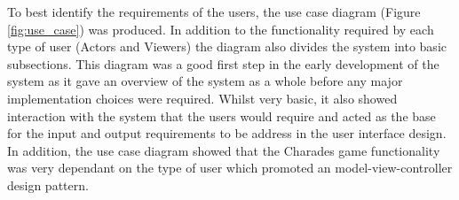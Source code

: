 To best identify the requirements of the users, the use case diagram (Figure \ref{fig:use_case}) was produced. In addition to the functionality required by each type of user (Actors and Viewers) the diagram also divides the system into basic subsections. This diagram was a good first step in the early development of the system as it gave an overview of the system as a whole before any major implementation choices were required. Whilst very basic, it also showed interaction with the system that the users would require and acted as the base for the input and output requirements to be address in the user interface design. In addition, the use case diagram showed that the Charades game functionality was very dependant on the type of user which promoted an model-view-controller design pattern.

\newpage

